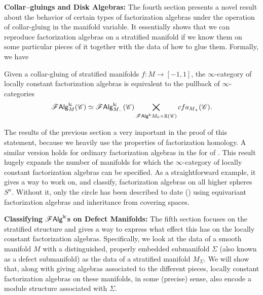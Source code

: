 \documentclass[../text.tex]{subfiles}
\begin{document}
\textbf{ Collar--gluings and Disk Algebras:} The fourth section presents a novel result about the behavior of certain types of factorization algebras under the operation of collar-gluing in the manifold variable. It essentially shows that we can reproduce factorization algebras on a stratified manifold if we know them on some particular pieces of it together with the data of how to glue them. Formally, we have
%
\begin{theorem*}[\ref{thm:gluing_lcfas}]
    Given a collar-gluing of stratified manifolds $f: M \rightarrow [-1,1]$, the $\infty$-category of locally constant factorization algebras is equivalent to the pullback of $\infty$-categories
    \begin{equation}
        \mathscr{F} \mathsf{Alg}^{\mathsf{lc}}_{M} (\mathscr{C}) \simeq \mathscr{F} \mathsf{Alg}^{\mathsf{lc}}_{M_-} (\mathscr{C}) \bigtimes_{\mathscr{F} \mathsf{Alg}^{\mathsf{lc}}{M_0 \times \mathbb{R}} (\mathscr{C})} \\cfa_{M_+} (\mathscr{C}).
    \end{equation}
\end{theorem*}
%
The results of the previous section a very important in the proof of this statement, because we heavily use the properties of factorization homology. A similar version holds for ordinary factorization algebras in the for of . This result hugely expands the number of manifolds for which the $\infty$-category of locally constant factorization algebras can be specified. As a straightforward example, it gives a way to work on, and classify, factorization algebras on all higher spheres $S^n$. Without it, only the circle has been described to date (\cite{ginot2015}) using equivariant factorization algebras and inheritance from covering spaces.

\textbf{ Classifying $\mathscr{F} \mathsf{Alg}^{\mathsf{lc}}$s on Defect Manifolds:} The fifth section focuses on the stratified structure and gives a way to express what effect this has on the locally constant factorization algebras. Specifically, we look at the data of a smooth manifold $M$ with a distinguished, properly embedded submanifold $\Sigma$ (also known as a defect submanifold) as the data of a stratified manifold $M_\Sigma$. We will show that, along with giving algebras associated to the different pieces, locally constant factorization algebras on these manifolds, in some (precise) sense, also encode a module structure associated with $\Sigma$.
\end{document}

